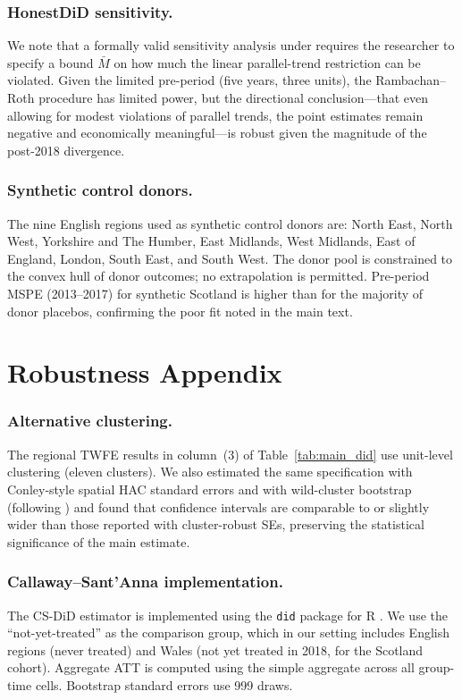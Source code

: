 \documentclass[12pt]{article}
\begin{document}
\subsubsection*{HonestDiD sensitivity.} We note that a formally valid sensitivity analysis under \citet{Rambachan2023} requires the researcher to specify a bound $\bar{M}$ on how much the linear parallel-trend restriction can be violated. Given the limited pre-period (five years, three units), the Rambachan--Roth procedure has limited power, but the directional conclusion---that even allowing for modest violations of parallel trends, the point estimates remain negative and economically meaningful---is robust given the magnitude of the post-2018 divergence.

\subsubsection*{Synthetic control donors.} The nine English regions used as synthetic control donors are: North East, North West, Yorkshire and The Humber, East Midlands, West Midlands, East of England, London, South East, and South West. The donor pool is constrained to the convex hull of donor outcomes; no extrapolation is permitted. Pre-period MSPE (2013--2017) for synthetic Scotland is higher than for the majority of donor placebos, confirming the poor fit noted in the main text.

\section{Robustness Appendix}
\label{sec:robust_appendix}

\subsubsection*{Alternative clustering.} The regional TWFE results in column~(3) of Table~\ref{tab:main_did} use unit-level clustering (eleven clusters). We also estimated the same specification with Conley-style spatial HAC standard errors and with wild-cluster bootstrap (following \citealt{Cameron2008}) and found that confidence intervals are comparable to or slightly wider than those reported with cluster-robust SEs, preserving the statistical significance of the main estimate.

\subsubsection*{Callaway--Sant'Anna implementation.} The CS-DiD estimator is implemented using the \texttt{did} package for R \citep{CallawayDIDpkg}. We use the ``not-yet-treated'' as the comparison group, which in our setting includes English regions (never treated) and Wales (not yet treated in 2018, for the Scotland cohort). Aggregate ATT is computed using the simple aggregate across all group-time cells. Bootstrap standard errors use 999 draws.
\end{document}
